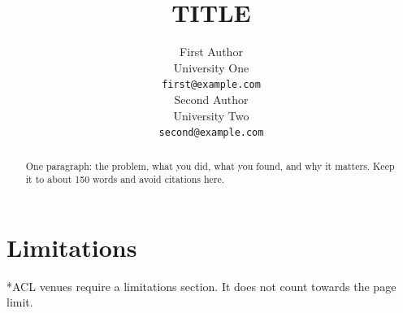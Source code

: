 \documentclass[11pt]{article}
\title{{{TITLE}}}
\author{First Author \\
  University One \\
  \texttt{first@example.com} \\\And
  Second Author \\
  University Two \\
  \texttt{second@example.com} \\}
\begin{document}
\maketitle

\begin{abstract}
One paragraph: the problem, what you did, what you found, and why it matters. Keep it to about 150 words and avoid citations here.
\end{abstract}




\section*{Limitations}

*ACL venues require a limitations section. It does not count towards the page limit.


\end{document}
